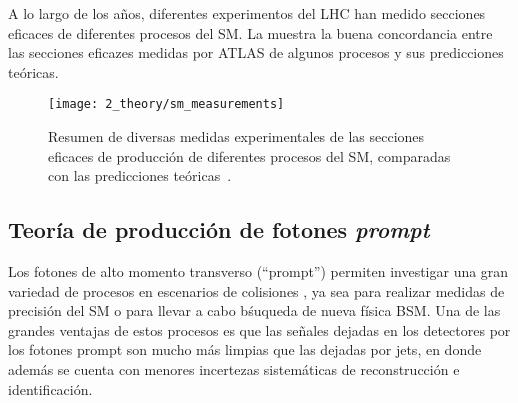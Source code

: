 A lo largo de los años, diferentes experimentos del \ac{LHC} han medido secciones eficaces de diferentes procesos del \ac{SM}. La \Fig{\ref{fig:theory:sm:hadron_interactions:sm_results}} muestra la buena concordancia entre las secciones eficazes medidas por \ac{ATLAS} de algunos procesos y sus predicciones teóricas.


\begin{figure}[ht!]
    \centering
    \texttt{[image: 2\_theory/sm\_measurements]}
    \caption{Resumen de diversas medidas experimentales de las secciones eficaces de producci\'on de diferentes procesos del \ac{SM}, comparadas con las predicciones te\'oricas~\cite{ATLAS-SM_Measurements}.}
    \label{fig:theory:sm:hadron_interactions:sm_results}
\end{figure}



\subsection{Teor\'ia de producci\'on de fotones \textit{prompt}}
\label{subsec:theory:sm:prompt_photon}


Los fotones de alto momento transverso (\enquote{prompt}) permiten investigar una gran variedad de procesos en escenarios de colisiones \pp, ya sea para realizar medidas de precisi\'on del \ac{SM} o para llevar a cabo b\'suqueda de nueva f\'isica \ac{BSM}. Una de las grandes ventajas de estos procesos es que las se\~nales dejadas en los detectores por los fotones prompt son mucho m\'as limpias que las dejadas por jets, en donde adem\'as se cuenta con menores incertezas sistem\'aticas de reconstrucci\'on e identificaci\'on.


